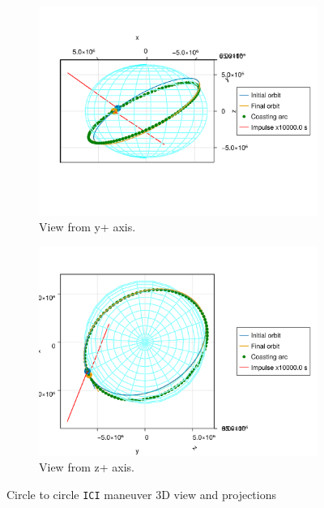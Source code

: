 \begin{figure}[htbp]
\begin{subfigure}{0.49\linewidth}
        \includegraphics[width=\linewidth]{../results/j2/ipv_noncop/ICI_y+.png}
        \caption{View from y+ axis.}
    \end{subfigure}
    \begin{subfigure}{0.49\linewidth}
        \includegraphics[width=\linewidth]{../results/j2/ipv_noncop/ICI_z+.png}
        \caption{View from z+ axis.}
    \end{subfigure}
    \caption{Circle to circle \texttt{ICI} maneuver 3D view and projections}
    \label{fig:j2_ncop_ICI_figs}
\end{figure}

